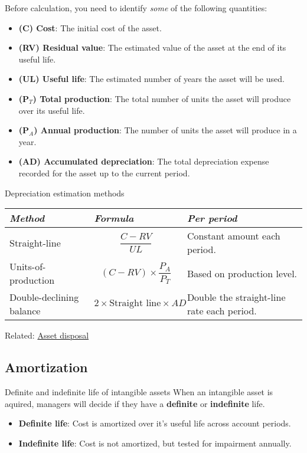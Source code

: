 Before calculation, you need to identify \textit{some} of the following quantities:
\begin{itemize}
    \item \textbf{(C) Cost}: The initial cost of the asset.
    \item \textbf{(RV) Residual value}: The estimated value of the asset at the end of its useful life.
    \item \textbf{(UL) Useful life}: The estimated number of years the asset will be used.
    \item \textbf{(P$_T$) Total production}: The total number of units the asset will produce over its useful life.
    \item \textbf{(P$_A$) Annual production}: The number of units the asset will produce in a year.
    \item \textbf{(AD) Accumulated depreciation}: The total depreciation expense recorded for the asset up to the current period.
\end{itemize}

\begin{theorem}
    {Depreciation estimation methods}
    \begin{tabular}{|p{}|p{}|p{}|}
        \hline
        \textit{Method}          & \textit{Formula}                            & \textit{Per period}                        \\
        \hline
        Straight-line            & \[\frac{C - RV}{UL}\]                       & Constant amount each period.               \\
        \hline
        Units-of-production      & \[(C - RV)\times\frac{P_A}{P_T}\]           & Based on production level.                 \\
        \hline
        Double-declining balance & \[2 \times \text{Straight line} \times AD\] & Double the straight-line rate each period. \\
        \hline
    \end{tabular}
\end{theorem}

Related: \hyperref[subsec:asset_disposal]{Asset disposal}

\subsection{Amortization}

\begin{definition}
    {Definite and indefinite life of intangible assets}
    When an intangible asset is aquired, managers will decide if they have a \textbf{definite} or \textbf{indefinite} life.
    \begin{itemize}
        \item \textbf{Definite life}: Cost is amortized over it's useful life across account periods.
        \item \textbf{Indefinite life}: Cost is not amortized, but tested for impairment annually.
    \end{itemize}
\end{definition}

